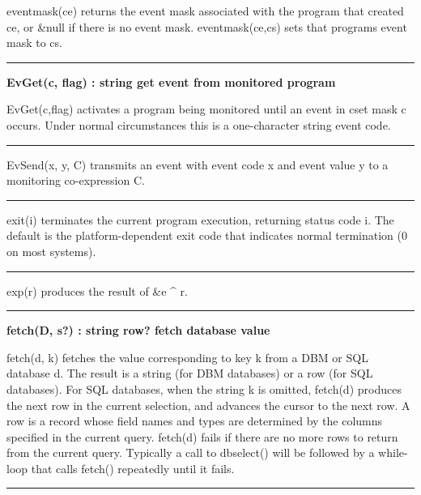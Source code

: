 \noindent
{}eventmask(ce) returns the event mask associated
with the program that created ce, or \&null if there is no event mask.
eventmask(ce,cs) sets that program{\textquotesingle}s event mask to cs.

\bigskip\hrule\vspace{0.1cm}
\noindent
{\bf EvGet(c, flag) : string \hfill get event from monitored program}

\noindent
EvGet(c,flag) activates a program being monitored until an event in cset
mask c occurs. Under normal circumstances this is a one-character
string event code.

\bigskip\hrule\vspace{0.1cm}

\noindent
{}EvSend(x, y, C) transmits an event with event
code x and event value y to a monitoring co-expression C.

\bigskip\hrule\vspace{0.1cm}

\noindent
{}exit(i) terminates the current program execution,
returning status code i. The default is the platform-dependent exit
code that indicates normal termination (0 on most systems).

\bigskip\hrule\vspace{0.1cm}

\noindent
{}exp(r) produces the result of \&e \^{} r.

\bigskip\hrule\vspace{0.1cm}
\noindent
{\bf fetch(D, s?) : string {\textbar} row? \hfill fetch database value}

\noindent
{}fetch(d, k) fetches the value corresponding to key k
from a DBM or SQL database d. The result is
a string (for DBM databases) or a row (for SQL databases). For SQL
databases, when the string k is omitted, fetch(d) produces the next row
in the current selection, and advances the cursor to the next row. A
row is a record whose field names and types are determined by the
columns specified in the current query. fetch(d) fails if there are no
more rows to return from the current query. Typically a call to
dbselect() will be followed by a while{}-loop that calls fetch()
repeatedly until it fails.

\bigskip\hrule\vspace{0.1cm}

